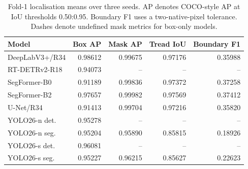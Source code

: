 \begin{table}[t]
\caption{Fold-1 localisation means over three seeds. AP denotes COCO-style AP at IoU thresholds 0.50:0.95. Boundary F1 uses a two-native-pixel tolerance. Dashes denote undefined mask metrics for box-only models.}
\label{tab:localisation}
\centering
\small
\setlength{\tabcolsep}{4pt}
\begin{tabular}{lrrrr}
\toprule
Model & Box AP & Mask AP & Tread IoU & Boundary F1 \\
\midrule
DeepLabV3+/R34 & 0.98612 & 0.99675 & 0.97176 & 0.35988 \\
RT-DETRv2-R18 & 0.94073 & -- & -- & -- \\
SegFormer-B0 & 0.91189 & 0.99836 & 0.97372 & 0.37258 \\
SegFormer-B2 & 0.97657 & 0.99982 & 0.97569 & 0.37412 \\
U-Net/R34 & 0.91413 & 0.99704 & 0.97216 & 0.35820 \\
YOLO26-n det. & 0.95278 & -- & -- & -- \\
YOLO26-n seg. & 0.95204 & 0.95890 & 0.85815 & 0.18926 \\
YOLO26-s det. & 0.96081 & -- & -- & -- \\
YOLO26-s seg. & 0.95227 & 0.96215 & 0.85627 & 0.22623 \\
\bottomrule
\end{tabular}
\end{table}
